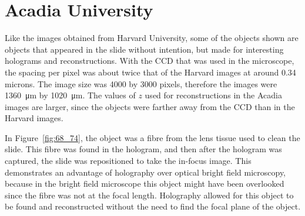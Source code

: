 %
%

\section{Acadia University}


Like the images obtained from Harvard University, some of the objects shown are
objects that appeared in the slide without intention, but made for interesting
holograms and reconstructions. With the CCD that was used in the microscope,
the spacing per pixel was about twice that of the Harvard images at around 0.34
microns. The image size was 4000 by 3000 pixels, therefore the images were
\SI{1360}{\micro\meter} by \SI{1020}{\micro\meter}. The values of $z$ used for
reconstructions in the Acadia images are larger, since the objects were farther
away from the CCD than in the Harvard images.

In Figure~\ref{fig:68_74}, the object was a fibre from the lens tissue used to
clean the slide. This fibre was found in the hologram, and then after the
hologram was captured, the slide was repositioned to take the in-focus image.
This demonstrates an advantage of holography over optical bright field
microscopy, because in the bright field microscope this object might have been
overlooked since the fibre was not at the focal length. Holography allowed for
this object to be found and reconstructed without the need to find the focal
plane of the object.



